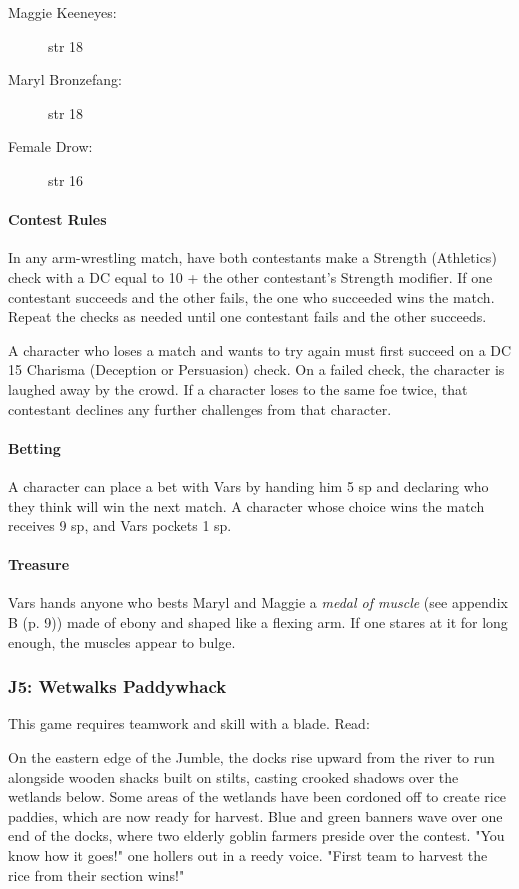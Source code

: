 \documentclass[letterpaper, 11pt, bg=full, twocolumn]{dndbook}
\begin{document}
\begin{description}
\item[Maggie Keeneyes:] str 18
\item[Maryl Bronzefang:] str 18
\item[Female Drow:] str 16
\end{description}

\paragraph{Contest Rules}

In any arm-wrestling match, have both contestants make a Strength (Athletics) check with a DC equal to 10 + the other contestant's Strength modifier. If one contestant succeeds and the other fails, the one who succeeded wins the match. Repeat the checks as needed until one contestant fails and the other succeeds.

A character who loses a match and wants to try again must first succeed on a DC 15 Charisma (Deception or Persuasion) check. On a failed check, the character is laughed away by the crowd. If a character loses to the same foe twice, that contestant declines any further challenges from that character.

\paragraph{Betting}

A character can place a bet with Vars by handing him 5 sp and declaring who they think will win the next match. A character whose choice wins the match receives 9 sp, and Vars pockets 1 sp.

\paragraph{Treasure}

Vars hands anyone who bests Maryl and Maggie a \textit{medal of muscle} (see appendix B (p. 9)) made of ebony and shaped like a flexing arm. If one stares at it for long enough, the muscles appear to bulge.

\subsubsection{J5: Wetwalks Paddywhack}

This game requires teamwork and skill with a blade. Read:

\begin{DndReadAloud}
On the eastern edge of the Jumble, the docks rise upward from the river to run alongside wooden shacks built on stilts, casting crooked shadows over the wetlands below. Some areas of the wetlands have been cordoned off to create rice paddies, which are now ready for harvest.
Blue and green banners wave over one end of the docks, where two elderly goblin farmers preside over the contest. "You know how it goes!" one hollers out in a reedy voice. "First team to harvest the rice from their section wins!"
\end{DndReadAloud}
\end{document}
